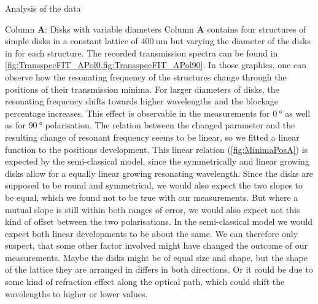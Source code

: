 \documentclass[pdftex, a4paper,11pt, twoside, UKenglish]{report}
\begin{document}
\begin{chapter}{Analysis of the data}
    \begin{section}{Column \textbf{A}: Disks with variable diameters}
      \label{chp:DataA}
      Column \textbf{A} contains four structures of simple disks in a constant
      lattice of $\SI{400}{\nano\meter}$ but varying the diameter of the disks
      in for each structure. The recorded transmission spectra can be found in
      \cref{fig:TransspecFIT_APol0,fig:TransspecFIT_APol90}.
      In those graphics, one can observe how the resonating frequency of the
      structures change through the positions of their transmission minima.
      For larger diameters of disks, the resonating frequency shifts towards
      higher wavelengths and the blockage percentage increases.
      This effect is observable in the measurements for $\SI{0}{\degree}$ as
      well as for $\SI{90}{\degree}$ polarisation. The relation between the
      changed parameter and the resulting change of resonant frequency seems to
      be linear, so we fitted a linear function to the positions development.
      This linear relation (\cref{fig:MinimaPosA}) is expected by the
      semi-classical model, since the symmetrically and linear growing disks
      allow for a equally linear growing resonating wavelength. Since the
      disks are supposed to be round and symmetrical, we would also expect the
      two slopes to be equal, which we found not to be true with our
      measurements. But where a mutual slope is still within both ranges of
      error, we would also expect not this kind of offset between the two
      polarisations. In the semi-classical model we would expect both linear
      developments to be about the same. We can therefore only suspect, that
      some other factor involved might have changed the outcome of our
      measurements. Maybe the disks might be of equal size and shape, but the
      shape of the lattice they are arranged in differs in both directions.
      Or it could be due to some kind of refraction effect along the optical
      path, which could shift the wavelengths to higher or lower values.
      
      

\end{section}
\end{chapter}
\end{document}
